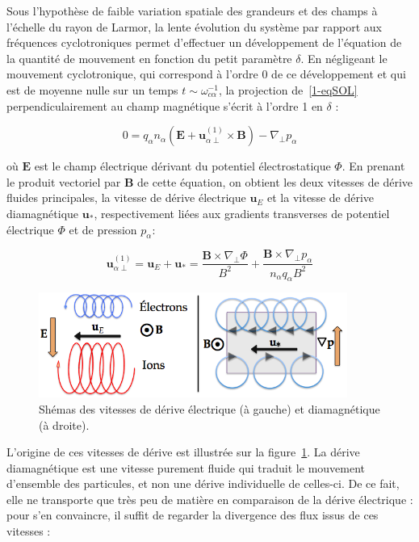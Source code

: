 \begin{refsection}
 Sous l'hypothèse de faible variation spatiale des grandeurs et des champs à
 l'échelle du rayon de Larmor, la lente évolution du système par rapport aux
 fréquences cyclotroniques permet d'effectuer un développement de l'équation de
 la quantité de mouvement en fonction du petit paramètre $\delta$. En négligeant
 le mouvement cyclotronique, qui correspond à l'ordre 0 de ce développement et qui
 est de moyenne nulle sur un temps $t\sim\omega_{c\alpha}^{-1}$, la projection
 de~\eqref{1-eqSOL} perpendiculairement au champ magnétique s'écrit à l'ordre 1
 en $\delta$ :
 
 \begin{equation}
\label{1-eqSOLperp}
0
={q_\alpha n_\alpha}\left(\mathbf E+\mathbf
u_{\alpha\perp}^{(1)}\times \mathbf B\right)
-{\nabla_\perp p_\alpha}
\end{equation}

où $\mathbf E$ est le champ électrique dérivant du potentiel électrostatique
$\Phi$. En prenant le produit vectoriel par $\mathbf B$ de cette équation, on
obtient les deux vitesses de dérive fluides principales, la vitesse de dérive
électrique $\mathbf u_E$ et la vitesse de dérive diamagnétique $\mathbf u_*$,
respectivement liées aux gradients transverses de potentiel électrique $\Phi$ et
de pression $p_\alpha$:

\begin{equation}
\label{1-eqVitessesDerive}
\mathbf u_{\alpha\perp}^{(1)}=\mathbf u_E+\mathbf u_*=\frac{\mathbf
B\times\nabla_\perp \Phi}{B^2}+\frac{\mathbf B\times\nabla_\perp
p_\alpha}{n_\alpha q_\alpha B^2}
\end{equation}

\begin{figure}[!htbp]
    \centering
	\includegraphics[width=0.9\textwidth]{figures/1-vitessesDerive.png}
	\caption{Shémas des vitesses de dérive électrique (à gauche) et diamagnétique
	(à droite).}
	\label{1-vitessesDerive}
\end{figure}

L'origine de ces vitesses de dérive est illustrée sur la
figure~\ref{1-vitessesDerive}. La dérive diamagnétique est une vitesse
purement fluide qui traduit le mouvement d'ensemble des particules, et non
une dérive individuelle de celles-ci. De ce fait, elle ne transporte que
très peu de matière en comparaison de la dérive électrique : pour s'en
convaincre, il suffit de regarder la divergence des flux issus de ces
vitesses :


\end{refsection}
